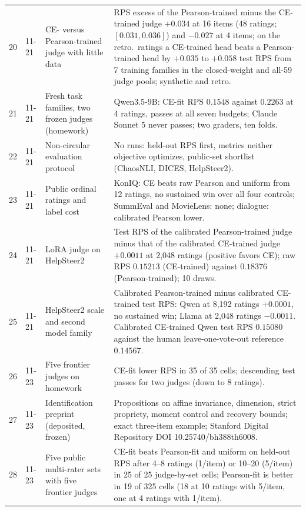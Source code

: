 {\begin{longtable}{@{}p{}p{}p{}p{}@{}}
20 & 11-21 & CE- versus Pearson-trained judge with little data & RPS excess of the Pearson-trained minus the CE-trained judge $+0.034$ at 16 items (48 ratings; $[0.031,0.036]$) and $-0.027$ at 4 items; on the retro.\ ratings a CE-trained head beats a Pearson-trained head by $+0.035$ to $+0.058$ test RPS from 7 training families in the closed-weight and all-59 judge pools; synthetic and retro. \\
21 & 11-21 & Fresh task families, two frozen judges (homework) & Qwen3.5-9B: CE-fit RPS $0.1548$ against $0.2263$ at 4 ratings, passes at all seven budgets; Claude Sonnet 5 never passes; two graders, ten folds. \\
22 & 11-21 & Non-circular evaluation protocol & No runs: held-out RPS first, metrics neither objective optimizes, public-set shortlist (ChaosNLI, DICES, HelpSteer2). \\
23 & 11-21 & Public ordinal ratings and label cost & KonIQ: CE beats raw Pearson and uniform from 12 ratings, no sustained win over all four controls; SummEval and MovieLens: none; dialogue: calibrated Pearson lower. \\
24 & 11-21 & LoRA judge on HelpSteer2 & Test RPS of the calibrated Pearson-trained judge minus that of the calibrated CE-trained judge $+0.0011$ at 2{,}048 ratings (positive favors CE); raw RPS $0.15213$ (CE-trained) against $0.18376$ (Pearson-trained); 10 draws. \\
25 & 11-21 & HelpSteer2 scale and second model family & Calibrated Pearson-trained minus calibrated CE-trained test RPS: Qwen at 8{,}192 ratings $+0.0001$, no sustained win; Llama at 2{,}048 ratings $-0.0011$. Calibrated CE-trained Qwen test RPS $0.15080$ against the human leave-one-vote-out reference $0.14567$. \\
26 & 11-23 & Five frontier judges on homework & CE-fit lower RPS in 35 of 35 cells; descending test passes for two judges (down to 8 ratings). \\
27 & 11-23 & Identification preprint (deposited, frozen) & Propositions on affine invariance, dimension, strict propriety, moment control and recovery bounds; exact three-item example; Stanford Digital Repository DOI 10.25740/bh388th6008. \\
28 & 11-23 & Five public multi-rater sets with five frontier judges & CE-fit beats Pearson-fit and uniform on held-out RPS after 4--8 ratings (1/item) or 10--20 (5/item) in 25 of 25 judge-by-set cells; Pearson-fit is better in 19 of 325 cells (18 at 10 ratings with 5/item, one at 4 ratings with 1/item). \\

\end{longtable}}
